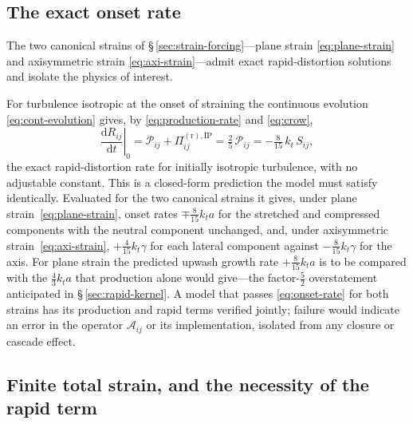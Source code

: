\documentclass[lineno]{JFM-FLM_Au}
\begin{document}
\subsection{The exact onset rate}\label{sec:onset}

The two canonical strains of \S\,\ref{sec:strain-forcing}---plane strain
\eqref{eq:plane-strain} and axisymmetric strain
\eqref{eq:axi-strain}---admit exact rapid-distortion solutions and
isolate the physics of interest.

For turbulence isotropic at the onset of straining the continuous
evolution \eqref{eq:cont-evolution} gives, by
\eqref{eq:production-rate} and \eqref{eq:crow},
\begin{equation}
  \left.\frac{\mathrm{d}R_{ij}}{\mathrm{d}t}\right|_{0}
  = \mathcal{P}_{ij}+\Pi^{(\mathrm r),\mathrm{IP}}_{ij}
  = \tfrac{2}{5}\,\mathcal{P}_{ij}
  = -\tfrac{8}{15}\,k_t\,S_{ij},
  \label{eq:onset-rate}
\end{equation}
the exact rapid-distortion rate for initially isotropic turbulence, with
no adjustable constant. This is a
closed-form prediction the model must satisfy identically. Evaluated for the two canonical strains it gives, under
plane strain~\eqref{eq:plane-strain}, onset rates $\mp\tfrac{8}{15}k_ta$ for the stretched and
compressed components with the neutral component unchanged, and, under
axisymmetric strain~\eqref{eq:axi-strain}, $+\tfrac{4}{15}k_t\gamma$ for each lateral
component against $-\tfrac{8}{15}k_t\gamma$ for the axis. For plane
strain the predicted upwash growth rate $+\tfrac{8}{15}k_ta$ is to be
compared with the $\tfrac43k_ta$ that production alone would give---the
factor-$\tfrac52$ overstatement anticipated in
\S\,\ref{sec:rapid-kernel}. A model that passes \eqref{eq:onset-rate}
for both strains has its production and rapid terms verified jointly;
failure would indicate an error in the operator $\mathcal{A}_{ij}$ or
its implementation, isolated from any closure or cascade effect.

\subsection{Finite total strain, and the necessity of the rapid term}
\label{sec:finite-strain}
\end{document}
